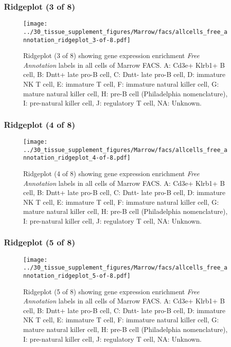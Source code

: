 \clearpage

\subsubsection{Ridgeplot (3 of 8)}
\begin{figure}[h]
\centering
\texttt{[image: ../30\_tissue\_supplement\_figures/Marrow/facs/allcells\_free\_annotation\_ridgeplot\_3-of-8.pdf]}

\caption{ Ridgeplot (3 of 8)  showing gene expression enrichment \emph{Free Annotation} labels in all cells of Marrow FACS. A: Cd3e+ Klrb1+ B cell, B: Dntt+ late pro-B cell, C: Dntt- late pro-B cell, D: immature NK T cell, E: immature T cell, F: immature natural killer cell, G: mature natural killer cell, H: pre-B cell (Philadelphia nomenclature), I: pre-natural killer cell, J: regulatory T cell, NA: Unknown.}
\end{figure}


\clearpage

\subsubsection{Ridgeplot (4 of 8)}
\begin{figure}[h]
\centering
\texttt{[image: ../30\_tissue\_supplement\_figures/Marrow/facs/allcells\_free\_annotation\_ridgeplot\_4-of-8.pdf]}

\caption{ Ridgeplot (4 of 8)  showing gene expression enrichment \emph{Free Annotation} labels in all cells of Marrow FACS. A: Cd3e+ Klrb1+ B cell, B: Dntt+ late pro-B cell, C: Dntt- late pro-B cell, D: immature NK T cell, E: immature T cell, F: immature natural killer cell, G: mature natural killer cell, H: pre-B cell (Philadelphia nomenclature), I: pre-natural killer cell, J: regulatory T cell, NA: Unknown.}
\end{figure}


\clearpage

\subsubsection{Ridgeplot (5 of 8)}
\begin{figure}[h]
\centering
\texttt{[image: ../30\_tissue\_supplement\_figures/Marrow/facs/allcells\_free\_annotation\_ridgeplot\_5-of-8.pdf]}

\caption{ Ridgeplot (5 of 8)  showing gene expression enrichment \emph{Free Annotation} labels in all cells of Marrow FACS. A: Cd3e+ Klrb1+ B cell, B: Dntt+ late pro-B cell, C: Dntt- late pro-B cell, D: immature NK T cell, E: immature T cell, F: immature natural killer cell, G: mature natural killer cell, H: pre-B cell (Philadelphia nomenclature), I: pre-natural killer cell, J: regulatory T cell, NA: Unknown.}
\end{figure}


